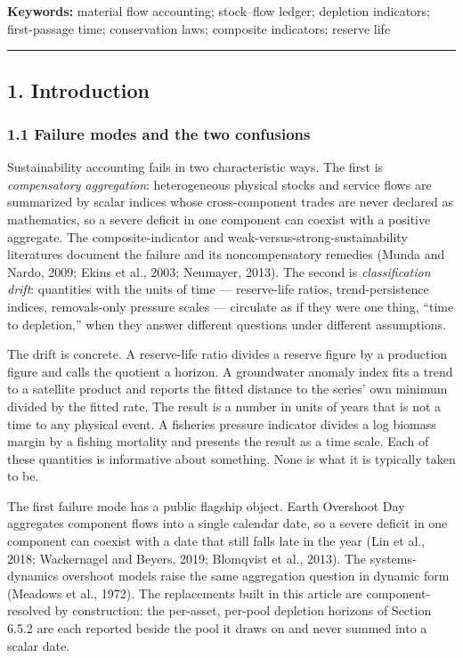 \documentclass[11pt]{article}
\begin{document}
\textbf{Keywords:} material flow accounting; stock--flow ledger;
depletion indicators; first-passage time; conservation laws; composite
indicators; reserve life

\begin{center}\rule{0.5\linewidth}{0.5pt}\end{center}

\subsection{1. Introduction}\label{introduction}

\subsubsection{1.1 Failure modes and the two
confusions}\label{failure-modes-and-the-two-confusions}

Sustainability accounting fails in two characteristic ways. The first is
\emph{compensatory aggregation}: heterogeneous physical stocks and
service flows are summarized by scalar indices whose cross-component
trades are never declared as mathematics, so a severe deficit in one
component can coexist with a positive aggregate. The composite-indicator
and weak-versus-strong-sustainability literatures document the failure
and its noncompensatory remedies (Munda and Nardo, 2009; Ekins et al.,
2003; Neumayer, 2013). The second is \emph{classification drift}:
quantities with the units of time --- reserve-life ratios,
trend-persistence indices, removals-only pressure scales --- circulate
as if they were one thing, ``time to depletion,'' when they answer
different questions under different assumptions.

The drift is concrete. A reserve-life ratio divides a reserve figure by
a production figure and calls the quotient a horizon. A groundwater
anomaly index fits a trend to a satellite product and reports the fitted
distance to the series' own minimum divided by the fitted rate. The
result is a number in units of years that is not a time to any physical
event. A fisheries pressure indicator divides a log biomass margin by a
fishing mortality and presents the result as a time scale. Each of these
quantities is informative about something. None is what it is typically
taken to be.

The first failure mode has a public flagship object. Earth Overshoot Day
aggregates component flows into a single calendar date, so a severe
deficit in one component can coexist with a date that still falls late
in the year (Lin et al., 2018; Wackernagel and Beyers, 2019; Blomqvist
et al., 2013). The systems-dynamics overshoot models raise the same
aggregation question in dynamic form (Meadows et al., 1972). The
replacements built in this article are component-resolved by
construction: the per-asset, per-pool depletion horizons of Section
6.5.2 are each reported beside the pool it draws on and never summed
into a scalar date.
\end{document}
